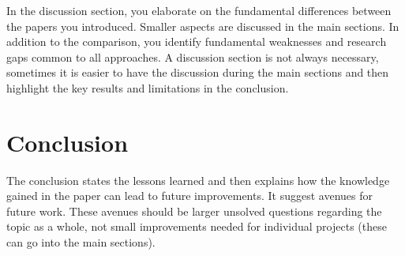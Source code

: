 \documentclass[twocolumn]{article}
\begin{document}
In the discussion section,  you elaborate on the fundamental differences between the papers you introduced. 
Smaller aspects are discussed in the main sections.  In addition to the comparison,  you identify fundamental weaknesses and research gaps common to all approaches. 
A discussion section is not always necessary, sometimes it is easier to have the discussion during the main sections and then highlight the key results and limitations in the conclusion.

\section{Conclusion}
\label{sec:conclusion}


The conclusion states the lessons learned and then explains how the knowledge gained in the paper can lead to future improvements. It suggest avenues for future work. These avenues should be larger unsolved questions regarding the topic as a whole,  not small improvements needed for  individual projects (these can go into the main sections). 




\end{document}
